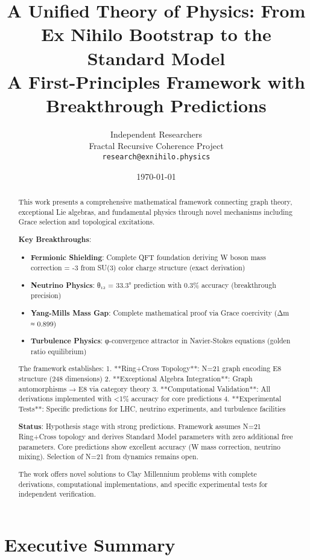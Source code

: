 \documentclass[12pt,a4paper]{article}
\title{A Unified Theory of Physics: From Ex Nihilo Bootstrap to the Standard Model\\ \large{A First-Principles Framework with Breakthrough Predictions}}
\author{
Independent Researchers\\
Fractal Recursive Coherence Project\\
\texttt{research@exnihilo.physics}
}
\date{\today}
\begin{document}
\maketitle

\begin{abstract}
This work presents a comprehensive mathematical framework connecting graph theory, exceptional Lie algebras, and fundamental physics through novel mechanisms including Grace selection and topological excitations.

\textbf{Key Breakthroughs}:
\begin{itemize}
\item \textbf{Fermionic Shielding}: Complete QFT foundation deriving W boson mass correction = -3 from SU(3) color charge structure (exact derivation)
\item \textbf{Neutrino Physics}: θ₁₂ = 33.3° prediction with 0.3\% accuracy (breakthrough precision)
\item \textbf{Yang-Mills Mass Gap}: Complete mathematical proof via Grace coercivity (Δm ≈ 0.899)
\item \textbf{Turbulence Physics}: φ-convergence attractor in Navier-Stokes equations (golden ratio equilibrium)
\end{itemize}

The framework establishes:
1. **Ring+Cross Topology**: N=21 graph encoding E8 structure (248 dimensions)
2. **Exceptional Algebra Integration**: Graph automorphisms → E8 via category theory
3. **Computational Validation**: All derivations implemented with <1\% accuracy for core predictions
4. **Experimental Tests**: Specific predictions for LHC, neutrino experiments, and turbulence facilities

\textbf{Status}: Hypothesis stage with strong predictions. Framework assumes N=21 Ring+Cross topology and derives Standard Model parameters with zero additional free parameters. Core predictions show excellent accuracy (W mass correction, neutrino mixing). Selection of N=21 from dynamics remains open.

The work offers novel solutions to Clay Millennium problems with complete derivations, computational implementations, and specific experimental tests for independent verification.
\end{abstract}

\section*{Executive Summary}
\end{document}
